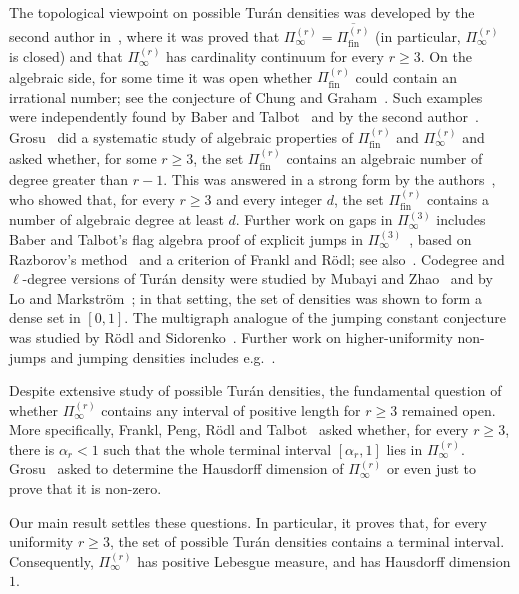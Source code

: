 \documentclass[10pt]{article}
\numberwithin{equation}{section}
\newcommand{\fin}{\mathrm{fin}}
\begin{document}
The topological viewpoint on possible Tur\'an densities was developed by the second author in~\cite{Pikhurko2014}, where it was proved that  $\Pi^{(r)}_\infty=\overline{\Pi^{(r)}_{\fin}}$ (in particular, $\Pi^{(r)}_\infty$ is closed) and that $\Pi^{(r)}_\infty$ has cardinality continuum for every $r\ge3$. On the algebraic side, for some time it was open whether $\Pi^{(r)}_{\fin}$ could contain an irrational number; see the conjecture of Chung and Graham~\cite[p.~95]{ChungGraham1998}. Such examples were independently found by Baber and Talbot~\cite{BaberTalbot2012} and by the second author~\cite{Pikhurko2014}.
Grosu~\cite{Grosu2016} did a systematic study of algebraic properties of $\Pi^{(r)}_{\fin}$ and $\Pi^{(r)}_\infty$ and asked whether, for some $r\ge3$, the set $\Pi^{(r)}_{\fin}$ contains an algebraic number of degree greater than $r-1$. This was answered in a strong form by the authors~\cite{LiuPikhurko2023}, who showed that, for every $r\ge3$ and every integer $d$, the set $\Pi^{(r)}_{\fin}$ contains a number of algebraic degree at least $d$. Further work on gaps in $\Pi_{\infty}^{(3)}$ includes Baber and Talbot's flag algebra proof of explicit jumps in $\Pi^{(3)}_\infty$~\cite{BaberTalbot2011}, based on Razborov's method~\cite{Razborov2007} and a criterion of Frankl and R\"odl; see also~\cite{BrownSimonovits1984,Pikhurko2015}. Codegree and $\ell$-degree versions of Tur\'an density were studied by Mubayi and Zhao~\cite{MubayiZhao07} and by Lo and Markstr\"om~\cite{LoMarkstrom14}; in that setting, the set of densities was shown to form a dense set in $[0,1]$. The multigraph analogue of the jumping constant conjecture was studied by R\"odl and Sidorenko~\cite{RodlSidorenko95}. Further work on higher-uniformity non-jumps and jumping densities includes e.g.~\cite{Peng07NonJumping4Uniform,Peng09JumpingDensities,Peng2008I,Peng2007II,HouLiYangZhang24}.

Despite extensive study of possible Tur\'an densities, the fundamental question of whether $\Pi^{(r)}_\infty$ contains any interval of positive length for $r\ge3$ remained open. More specifically, Frankl, Peng, R\"odl and Talbot~\cite[Question~6.1]{FPRT2007} asked whether, for every $r\ge3$, there is $\alpha_r<1$ such that the whole terminal interval $[\alpha_r,1]$ lies in $\Pi^{(r)}_\infty$. Grosu~\cite[Problem~5]{Grosu2016} asked to determine the Hausdorff dimension of $\Pi^{(r)}_\infty$ or even just to prove that it is non-zero.

Our main result settles these questions. In particular, it proves that, for every uniformity $r\ge3$, the set of possible Tur\'an densities contains a terminal interval. Consequently, $\Pi^{(r)}_\infty$ has positive Lebesgue measure, and has Hausdorff dimension $1$.
\end{document}
